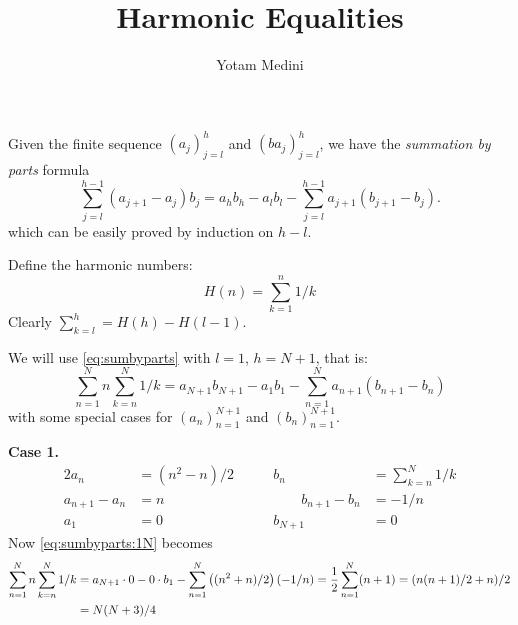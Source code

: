 \documentclass{article}
\title{Harmonic Equalities}
\author{Yotam Medini}
\newcommand{\isbook}{Yes}
\newcommand{\isbook}{No}
\newcommand{\isarticle}{Yes}
\newcommand{\isarticle}{No}
\begin{document}
\maketitle


Given the finite sequence
\((a_j)_{j=l}^{h}\) and
\((ba_j)_{j=l}^{h}\),
we have the  \emph{summation by parts} formula
\begin{equation} \label{eq:sumbyparts}
\sum_{j=l}^{h-1} (a_{j+1} - a_j)b_j
 = a_{h} b_{h} - a_l b_l - \sum_{j=l}^{h-1} a_{j+1}(b_{j+1} - b_j).
\end{equation}
which can be easily proved by induction on \(h-l\).

Define the harmonic numbers:
\begin{equation*}
H(n) = \sum_{k=1}^n 1/k
\end{equation*}
Clearly \(\sum_{k=l}^h = H(h) - H(l-1)\).

\iffalse
Now define the following 
\begin{align*}
U(N) &= \sum_{n=1}^N (2n-1) \sum_{k=n}^N 1/k \\
T(N) &= \sum_{n=1}^N (2n-1) \left(\sum_{k=n}^N 1/k\right)^2
\end{align*}
We shall show
\begin{equation}
\forall N \geq 0, \qquad U(N) = T(N) = N(N+1)/2.
\end{equation}
\fi

We will use \eqref{eq:sumbyparts} with \(l=1\), \(h=N+1\), that is:
\begin{equation}   \label{eq:sumbyparts:1N}
\sum_{n=1}^N n \sum_{k=n}^N 1/k
= a_{N+1}b_{N+1} - a_1 b_1 - \sum_{n=1}^N a_{n+1}(b_{n+1} - b_n)
\end{equation}
with some special cases for
\((a_n)_{n=1}^{N+1}\) and \((b_n)_{n=1}^{N+1}\).

\textbf{Case 1.}
\begin{alignat*}{2}
a_n &= (n^2-n)/2  \qquad  &           b_n &= \sum_{k=n}^N 1/k \\
a_{n+1} - a_n &= n  &  \qquad b_{n+1} - b_n &= -1/n \\
a_1 &= 0           &               b_{N+1} &= 0
\end{alignat*}
Now \eqref{eq:sumbyparts:1N} becomes
\begin{align}
\sum_{n=1}^N n \sum_{k=n}^N 1/k
&= a_{N+1}\cdot 0 - 0 \cdot b_1 - \sum_{n=1}^N \left((n^2+n)/2\right)(-1/n)
= \frac{1}{2} \sum_{n=1}^N (n+1) 
= (n(n+1)/2+n)/2
\notag \\
&= N(N+3)/4
\end{align}
\end{document}
